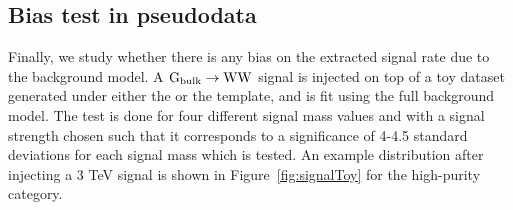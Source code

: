 \subsection{Bias test in pseudodata}
\label{sec:bias}
Finally, we study whether there is any bias on the extracted signal rate due to the background model. A $\mathrm{G}_\mathrm{bulk} \rightarrow\mathrm{W}\mathrm{W}$ signal is injected on top of a toy dataset generated under either the  or the \HERWIG{++} template, and is fit using the full background model. The test is done for four different signal mass values and with a signal strength chosen such that it corresponds to a significance of 4-4.5 standard deviations for each signal mass which is tested. An example distribution after injecting a 3 TeV signal is shown in Figure~\ref{fig:signalToy} for the high-purity category.
\begin{figure}[h!]
\centering
{}

\end{figure}
